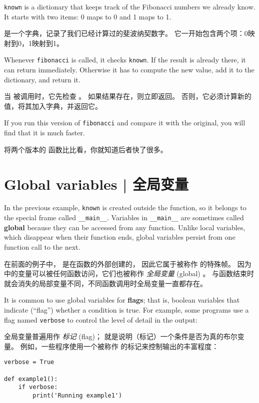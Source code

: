 %
{\tt known} is a dictionary that keeps track of the Fibonacci
numbers we already know.  It starts with
two items: 0 maps to 0 and 1 maps to 1.

 是一个字典，记录了我们已经计算过的斐波纳契数字。
它一开始包含两个项：0映射到0，1映射到1。

Whenever {\tt fibonacci} is called, it checks {\tt known}.
If the result is already there, it can return
immediately.  Otherwise it has to
compute the new value, add it to the dictionary, and return it.

当  被调用时，它先检查  。 如果结果存在，则立即返回。 否则，它必须计算新的值，将其加入字典，并返回它。

If you run this version of {\tt fibonacci} and compare it with
the original, you will find that it is much faster.

将两个版本的  函数比比看，你就知道后者快了很多。


\section{Global variables  |  全局变量}

  

In the previous example, {\tt known} is created outside the function,
so it belongs to the special frame called \verb"__main__".
Variables in \verb"__main__" are sometimes called {\bf global}
because they can be accessed from any function.  Unlike local
variables, which disappear when their function ends, global variables
persist from one function call to the next.

在前面的例子中， 是在函数的外部创建的，
因此它属于被称作  的特殊帧。
因为  中的变量可以被任何函数访问，它们也被称作 {\em 全局变量} (global) 。 与函数结束时就会消失的局部变量不同，不同函数调用时全局变量一直都存在。


It is common to use global variables for {\bf flags}; that is,
boolean variables that indicate (``flag'') whether a condition
is true.  For example, some programs use
a flag named {\tt verbose} to control the level of detail in the
output:

全局变量普遍用作 {\em 标记} (flag)； 就是说明（标记）一个条件是否为真的布尔变量。
例如，一些程序使用一个被称作  的标记来控制输出的丰富程度：

\begin{lstlisting}
verbose = True

def example1():
    if verbose:
        print('Running example1')
\end{lstlisting}

